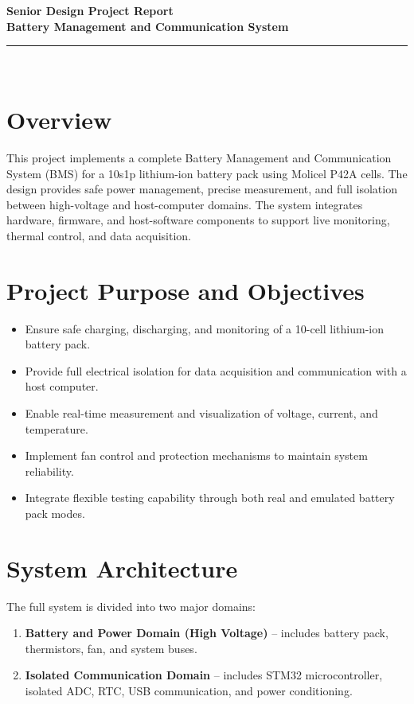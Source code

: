 \documentclass[12pt,a4paper]{article}
\begin{document}
\begin{center}
    {\Huge \textbf{Senior Design Project Report}} \\[0.3cm]
    {\Large \textbf{Battery Management and Communication System}} \\[0.2cm]
    \rule{0.9\linewidth}{0.5pt} \\[0.5cm]
\end{center}

\section{Overview}
This project implements a complete Battery Management and Communication System (BMS) for a 10s1p lithium-ion battery pack using Molicel P42A cells. The design provides safe power management, precise measurement, and full isolation between high-voltage and host-computer domains. The system integrates hardware, firmware, and host-software components to support live monitoring, thermal control, and data acquisition.

\section{Project Purpose and Objectives}
\begin{itemize}
    \item Ensure safe charging, discharging, and monitoring of a 10-cell lithium-ion battery pack.
    \item Provide full electrical isolation for data acquisition and communication with a host computer.
    \item Enable real-time measurement and visualization of voltage, current, and temperature.
    \item Implement fan control and protection mechanisms to maintain system reliability.
    \item Integrate flexible testing capability through both real and emulated battery pack modes.
\end{itemize}

\section{System Architecture}
The full system is divided into two major domains:
\begin{enumerate}
    \item \textbf{Battery and Power Domain (High Voltage)} – includes battery pack, thermistors, fan, and system buses.
    \item \textbf{Isolated Communication Domain} – includes STM32 microcontroller, isolated ADC, RTC, USB communication, and power conditioning.
\end{enumerate}
\end{document}
